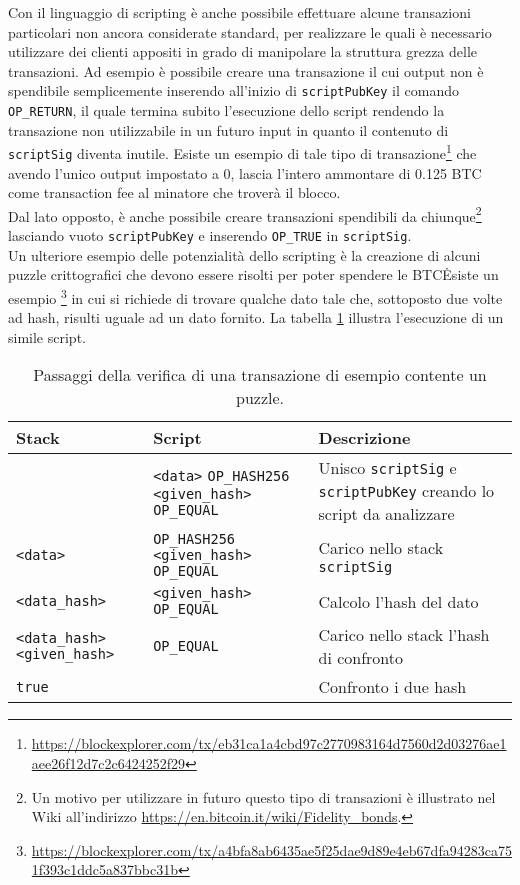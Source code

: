 Con il linguaggio di scripting è anche possibile effettuare alcune transazioni particolari non ancora considerate standard, per realizzare le quali è necessario utilizzare dei clienti appositi in grado di manipolare la struttura grezza delle transazioni. Ad esempio è possibile creare una transazione il cui output non è spendibile semplicemente inserendo all'inizio di \verb|scriptPubKey| il comando \verb|OP_RETURN|, il quale termina subito l'esecuzione dello script rendendo la transazione non utilizzabile in un futuro input in quanto il contenuto di \verb|scriptSig| diventa inutile. Esiste un esempio di tale tipo di transazione\footnote{\url{https://blockexplorer.com/tx/eb31ca1a4cbd97c2770983164d7560d2d03276ae1aee26f12d7c2c6424252f29}} che avendo l'unico output impostato a 0, lascia l'intero ammontare di 0.125 BTC come transaction fee al minatore che troverà il blocco.\\
Dal lato opposto, è anche possibile creare transazioni spendibili da chiunque\footnote{Un motivo per utilizzare in futuro questo tipo di transazioni è illustrato nel Wiki all'indirizzo \url{https://en.bitcoin.it/wiki/Fidelity_bonds}.} lasciando vuoto \verb|scriptPubKey| e inserendo \verb|OP_TRUE| in \verb|scriptSig|.\\
Un ulteriore esempio delle potenzialità dello scripting è la creazione di alcuni puzzle crittografici che devono essere risolti per poter spendere le BTC\. Esiste un esempio \footnote{\url{https://blockexplorer.com/tx/a4bfa8ab6435ae5f25dae9d89e4eb67dfa94283ca751f393c1ddc5a837bbc31b}} in cui si richiede di trovare qualche dato tale che, sottoposto due volte ad hash, risulti uguale ad un dato fornito. La tabella \ref{table:puzzle-transaction} illustra l'esecuzione di un simile script.

\begin{table}
  \centering
  \begin{tabular}{m{} | m{} | m{}}
    \hline
    Stack&Script&Descrizione \\
    \hline
    \verb||&\verb|<data>| \verb|OP_HASH256| \verb|<given_hash>| \verb|OP_EQUAL|&Unisco \verb|scriptSig| e \verb|scriptPubKey| creando lo script da analizzare  \\ \hline
    \verb|<data>|&\verb|OP_HASH256| \verb|<given_hash>| \verb|OP_EQUAL|&Carico nello stack \verb|scriptSig| \\ \hline
    \verb|<data_hash>|&\verb|<given_hash>| \verb|OP_EQUAL|&Calcolo l'hash del dato \\ \hline
    \verb|<data_hash>| \verb|<given_hash>|&\verb|OP_EQUAL|&Carico nello stack l'hash di confronto \\ \hline
    \verb|true|&\verb||&Confronto i due hash \\ \hline
  \end{tabular}
  \caption{Passaggi della verifica di una transazione di esempio contente un puzzle.\label{table:puzzle-transaction}}
\end{table}

